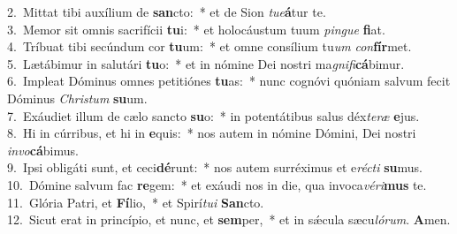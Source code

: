 {2.~}Mittat tibi auxílium de \textbf{san}cto:~* et de Sion \textit{tu}\textit{e}\textbf{á}tur te.\\
{3.~}Memor sit omnis sacrifícii \textbf{tu}i:~* et holocáustum tuum \textit{pin}\textit{gue} \textbf{fi}at.\\
{4.~}Tríbuat tibi secúndum cor \textbf{tu}um:~* et omne consílium tu\textit{um} \textit{con}\textbf{fír}met.\\
{5.~}Lætábimur in salutári \textbf{tu}o:~* et in nómine Dei nostri ma\textit{gni}\textit{fi}\textbf{cá}bimur.\\
{6.~}Impleat Dóminus omnes petitiónes \textbf{tu}as:~* nunc cognóvi quóniam salvum fecit Dóminus \textit{Chri}\textit{stum} \textbf{su}um.\\
{7.~}Exáudiet illum de cælo sancto \textbf{su}o:~* in potentátibus salus déx\textit{te}\textit{ræ} \textbf{e}jus.\\
{8.~}Hi in cúrribus, et hi in \textbf{e}quis:~* nos autem in nómine Dómini, Dei nostri \textit{in}\textit{vo}\textbf{cá}bimus.\\
{9.~}Ipsi obligáti sunt, et ceci\textbf{dé}runt:~* nos autem surréximus et e\textit{ré}\textit{cti} \textbf{su}mus.\\
{10.~}Dómine salvum fac \textbf{re}gem:~* et exáudi nos in die, qua invoca\textit{vé}\textit{ri}\textbf{mus} te.\\
{11.~}Glória Patri, et \textbf{Fí}lio,~* et Spirí\textit{tu}\textit{i} \textbf{San}cto.\\
{12.~}Sicut erat in princípio, et nunc, et \textbf{sem}per,~* et in sǽcula sæcu\textit{ló}\textit{rum}. \textbf{A}men.\\
